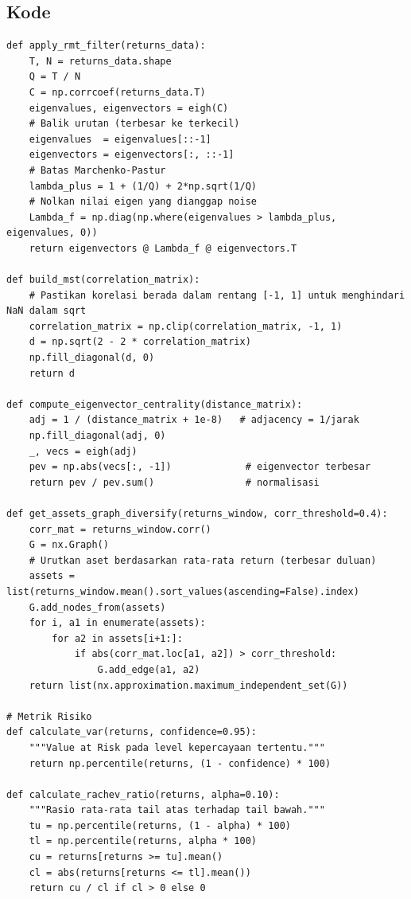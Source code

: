 \documentclass[12pt,a4paper]{article}
\begin{document}
\subsection{Kode}
\begin{lstlisting}[caption={Helper functions dan metrik risiko}]
def apply_rmt_filter(returns_data):
    T, N = returns_data.shape
    Q = T / N
    C = np.corrcoef(returns_data.T)
    eigenvalues, eigenvectors = eigh(C)
    # Balik urutan (terbesar ke terkecil)
    eigenvalues  = eigenvalues[::-1]
    eigenvectors = eigenvectors[:, ::-1]
    # Batas Marchenko-Pastur
    lambda_plus = 1 + (1/Q) + 2*np.sqrt(1/Q)
    # Nolkan nilai eigen yang dianggap noise
    Lambda_f = np.diag(np.where(eigenvalues > lambda_plus, eigenvalues, 0))
    return eigenvectors @ Lambda_f @ eigenvectors.T

def build_mst(correlation_matrix):
    # Pastikan korelasi berada dalam rentang [-1, 1] untuk menghindari NaN dalam sqrt
    correlation_matrix = np.clip(correlation_matrix, -1, 1)
    d = np.sqrt(2 - 2 * correlation_matrix)
    np.fill_diagonal(d, 0)
    return d

def compute_eigenvector_centrality(distance_matrix):
    adj = 1 / (distance_matrix + 1e-8)   # adjacency = 1/jarak
    np.fill_diagonal(adj, 0)
    _, vecs = eigh(adj)
    pev = np.abs(vecs[:, -1])             # eigenvector terbesar
    return pev / pev.sum()                # normalisasi

def get_assets_graph_diversify(returns_window, corr_threshold=0.4):
    corr_mat = returns_window.corr()
    G = nx.Graph()
    # Urutkan aset berdasarkan rata-rata return (terbesar duluan)
    assets = list(returns_window.mean().sort_values(ascending=False).index)
    G.add_nodes_from(assets)
    for i, a1 in enumerate(assets):
        for a2 in assets[i+1:]:
            if abs(corr_mat.loc[a1, a2]) > corr_threshold:
                G.add_edge(a1, a2)
    return list(nx.approximation.maximum_independent_set(G))

# Metrik Risiko
def calculate_var(returns, confidence=0.95):
    """Value at Risk pada level kepercayaan tertentu."""
    return np.percentile(returns, (1 - confidence) * 100)

def calculate_rachev_ratio(returns, alpha=0.10):
    """Rasio rata-rata tail atas terhadap tail bawah."""
    tu = np.percentile(returns, (1 - alpha) * 100)
    tl = np.percentile(returns, alpha * 100)
    cu = returns[returns >= tu].mean()
    cl = abs(returns[returns <= tl].mean())
    return cu / cl if cl > 0 else 0


\end{lstlisting}
\end{document}
